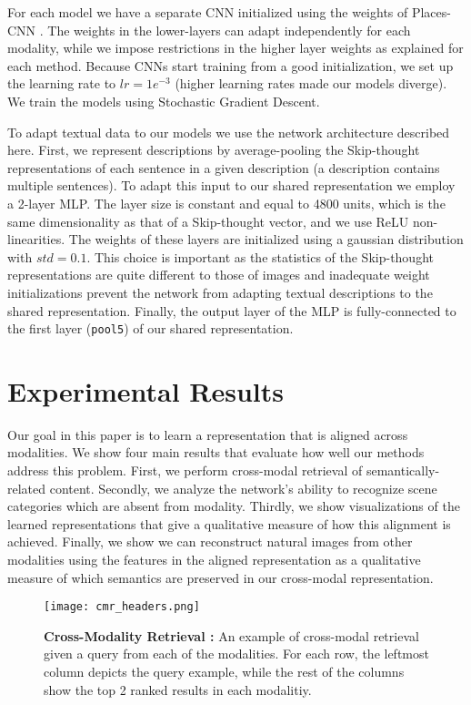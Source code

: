 \documentclass[10pt,journal,compsoc]{IEEEtran}
\begin{document}
    For each model we have a separate CNN initialized using the weights of Places-CNN \cite{zhou2014learning}. The weights in the lower-layers can adapt independently for each modality, while we impose restrictions in the higher layer weights as explained for each method. Because CNNs start training from a good initialization, we set up the learning rate to $lr = 1e^{-3}$ (higher learning rates made our models diverge). We train the models using Stochastic Gradient Descent.
    
    To adapt textual data to our models we use the network architecture described here. First, we represent descriptions by average-pooling the Skip-thought \cite{kiros2015skip} representations of each sentence in a given description (a description contains multiple sentences). To adapt this input to our shared representation we employ a 2-layer MLP. The layer size is constant and equal to 4800 units, which is the same dimensionality as that of a Skip-thought vector, and we use ReLU non-linearities. The weights of these layers are initialized using a gaussian distribution with $std = 0.1$. This choice is important as the statistics of the Skip-thought representations are quite different to those of images and inadequate weight initializations prevent the network from adapting textual descriptions to the shared representation. Finally, the output layer of the MLP is fully-connected to the first layer (\texttt{pool5}) of our shared representation.


\section{Experimental Results}

	
	Our goal in this paper is to learn a representation that is aligned across modalities. We show four main results that evaluate how well our methods address this problem. First, we perform cross-modal retrieval of semantically-related content. Secondly, we analyze the network's ability to recognize scene categories which are absent from modality. Thirdly, we show visualizations of the learned representations that give a qualitative measure of how this alignment is achieved. Finally, we show we can reconstruct natural images from other modalities using the features in the aligned representation as a qualitative measure of which semantics are preserved in our cross-modal representation. 
	
	            \begin{figure*}[t]
        \begin{center}
            \texttt{[image: cmr\_headers.png]} 
        \end{center}
        \caption{\textbf{Cross-Modality Retrieval :} An example of cross-modal retrieval given a query from each of the modalities. For each row, the leftmost column depicts the query example, while the rest of the columns show the top 2 ranked results in each modalitiy.}
        \label{fig:cmr_qualitative}
    \end{figure*}
\end{document}
